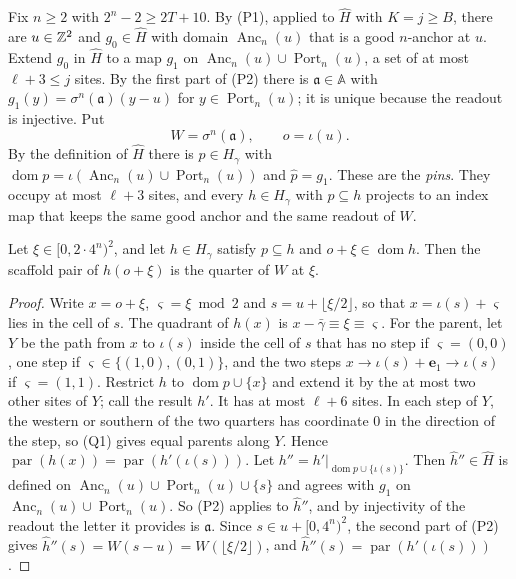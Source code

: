 Fix $n\ge2$ with $2^n-2\ge2T+10$. By (P1), applied to $\widehat H$ with $K=j\ge B$, there are $u\in\mathbb{Z}^2$ and $g_0\in\widehat H$ with domain $\operatorname{Anc}_n(u)$ that is a good $n$-anchor at $u$. Extend $g_0$ in $\widehat H$ to a map $g_1$ on $\operatorname{Anc}_n(u)\cup\operatorname{Port}_n(u)$, a set of at most $\ell+3\le j$ sites. By the first part of (P2) there is $\mathfrak a\in\mathbb A$ with $g_1(y)=\sigma^n(\mathfrak a)(y-u)$ for $y\in\operatorname{Port}_n(u)$; it is unique because the readout is injective. Put
\[
W=\sigma^n(\mathfrak a),\qquad o=\iota(u).
\]
By the definition of $\widehat H$ there is $p\in H_\gamma$ with $\operatorname{dom}p=\iota(\operatorname{Anc}_n(u)\cup\operatorname{Port}_n(u))$ and $\hat p=g_1$. These are the \emph{pins}. They occupy at most $\ell+3$ sites, and every $h\in H_\gamma$ with $p\subseteq h$ projects to an index map that keeps the same good anchor and the same readout of $W$.

\begin{lemma}\label{ref:forced}
Let $\xi\in[0,2\cdot4^n)^2$, and let $h\in H_\gamma$ satisfy $p\subseteq h$ and $o+\xi\in\operatorname{dom}h$. Then the scaffold pair of $h(o+\xi)$ is the quarter of $W$ at $\xi$.
\end{lemma}

\begin{proof}
Write $x=o+\xi$, $\varsigma=\xi\bmod2$ and $s=u+\lfloor\xi/2\rfloor$, so that $x=\iota(s)+\varsigma$ lies in the cell of $s$. The quadrant of $h(x)$ is $x-\bar\gamma\equiv\xi\equiv\varsigma$. For the parent, let $Y$ be the path from $x$ to $\iota(s)$ inside the cell of $s$ that has no step if $\varsigma=(0,0)$, one step if $\varsigma\in\{(1,0),(0,1)\}$, and the two steps $x\to\iota(s)+\mathbf e_1\to\iota(s)$ if $\varsigma=(1,1)$. Restrict $h$ to $\operatorname{dom}p\cup\{x\}$ and extend it by the at most two other sites of $Y$; call the result $h'$. It has at most $\ell+6$ sites. In each step of $Y$, the western or southern of the two quarters has coordinate $0$ in the direction of the step, so (Q1) gives equal parents along $Y$. Hence $\operatorname{par}(h(x))=\operatorname{par}(h'(\iota(s)))$. Let $h''=h'|_{\operatorname{dom}p\cup\{\iota(s)\}}$. Then $\hat h''\in\widehat H$ is defined on $\operatorname{Anc}_n(u)\cup\operatorname{Port}_n(u)\cup\{s\}$ and agrees with $g_1$ on $\operatorname{Anc}_n(u)\cup\operatorname{Port}_n(u)$. So (P2) applies to $\hat h''$, and by injectivity of the readout the letter it provides is $\mathfrak a$. Since $s\in u+[0,4^n)^2$, the second part of (P2) gives $\hat h''(s)=W(s-u)=W(\lfloor\xi/2\rfloor)$, and $\hat h''(s)=\operatorname{par}(h'(\iota(s)))$.
\end{proof}

